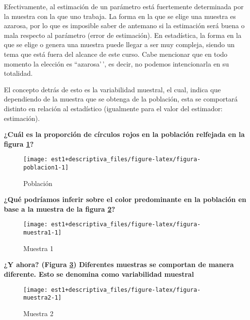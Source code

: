\documentclass[
]{book}
\theoremstyle{definition}
\theoremstyle{definition}
\theoremstyle{definition}
\theoremstyle{definition}
\theoremstyle{remark}
\begin{document}
Efectivamente, al estimación de un parámetro está fuertemente determinada por la muestra con la que uno trabaja. La forma en la que se elige una muestra es azarosa, por lo que es imposible saber de antemano si la estimación será buena o mala respecto al parámetro (error de estimación). En estadística, la forma en la que se elige o genera una muestra puede llegar a ser muy compleja, siendo un tema que está fuera del alcance de este curso. Cabe mencionar que en todo momento la elección es ``azarosa'\,', es decir, no podemos intencionarla en su totalidad.

El concepto detrás de esto es la variabilidad muestral, el cual, indica que dependiendo de la muestra que se obtenga de la población, esta se comportará distinto en relación al estadístico (igualmente para el valor del estimador: estimación).

\textbf{¿Cuál es la proporción de círculos rojos en la población relfejada en la figura \ref{fig:figura-poblacion1}?}

\begin{figure}

{\centering \texttt{[image: est1+descriptiva\_files/figure-latex/figura-poblacion1-1]} 

}

\caption{Población}\label{fig:figura-poblacion1}
\end{figure}

\textbf{¿Qué podríamos inferir sobre el color predominante en la población en base a la muestra de la figura \ref{fig:figura-muestra1}?}

\begin{figure}

{\centering \texttt{[image: est1+descriptiva\_files/figure-latex/figura-muestra1-1]} 

}

\caption{Muestra 1}\label{fig:figura-muestra1}
\end{figure}

\textbf{¿Y ahora? (Figura \ref{fig:figura-muestra2}) Diferentes muestras se comportan de manera diferente. Esto se denomina como variabilidad muestral}

\begin{figure}

{\centering \texttt{[image: est1+descriptiva\_files/figure-latex/figura-muestra2-1]} 

}

\caption{Muestra 2}\label{fig:figura-muestra2}
\end{figure}
\end{document}
